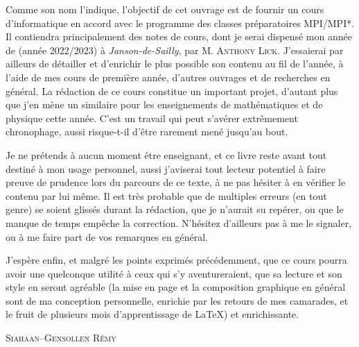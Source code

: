 \documentclass[a4paper,french,bookmarks]{book}
\begin{document}
    \begin{center}
        \begin{minipage}{0.85\linewidth}
            \large \qquad Comme son nom l'indique, l'objectif de cet ouvrage est de fournir un cours d'informatique en accord avec le programme des classes préparatoires \textsf{MPI/MPI*}. Il contiendra principalement des notes de cours, dont je serai dispensé mon année de  (année 2022/2023) à \textit{Janson-de-Sailly}, par M. \textsc{Anthony Lick}. J'essaierai par ailleurs de détailler et d'enrichir le plus possible son contenu au fil de l'année, à l'aide de mes cours de première année, d'autres ouvrages et de recherches en général. La rédaction de ce cours constitue un important projet, d'autant plus que j'en mène un similaire pour les enseignements de mathématiques et de physique cette année. C'est un travail qui peut s'avérer extrêmement chronophage, aussi risque-t-il d'être rarement mené jusqu'au bout.\newline
    
            \qquad Je ne prétends à aucun moment être enseignant, et ce livre reste avant tout destiné à mon usage personnel, aussi j'aviserai tout lecteur potentiel à faire preuve de prudence lors du parcours de ce texte, à ne pas hésiter à en vérifier le contenu par lui même. Il est très probable que de multiples erreurs (en tout genre) se soient glissés durant la rédaction, que je n'aurait su repérer, ou que le manque de temps empêche la correction. N'hésitez d'ailleurs pas à me le signaler, ou à me faire part de vos remarques en général.\newline
    
            \qquad J'espère enfin, et malgré les points exprimés précédemment, que ce cours pourra avoir une quelconque utilité à ceux qui s'y aventureraient, que sa lecture et son style en seront agréable (la mise en page et la composition graphique en général sont de ma conception personnelle, enrichie par les retours de mes camarades, et le fruit de plusieurs mois d'apprentissage de \LaTeX) et enrichissante.\newline\newline\newline\text{}
        \end{minipage}
    \end{center}
    
    \hfill{\large\textsc{Siahaan--Gensollen Rémy}}
    
    \pagestyle{intro}
    
\end{document}

